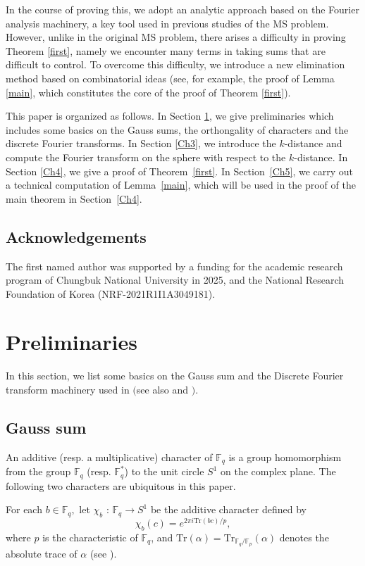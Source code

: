 \documentclass[a4paper,11pt]{amsart}
\numberwithin{equation}{section}
\def\Fq#1{\mathbb{F}_q^{#1}}
\begin{document}
In the course of proving this, we adopt an analytic approach based on the Fourier analysis machinery, a key tool used in previous studies of the MS problem. However, unlike in the original MS problem, there arises a difficulty in proving  Theorem \ref{first}, namely we encounter  many terms in taking sums that are difficult to control. To overcome this difficulty, we introduce a new elimination method based on combinatorial ideas (see, for example, the proof of Lemma \ref{main}, which constitutes the core of the proof of Theorem \ref{first}).

This paper  is organized as follows. In Section \ref{Ch2}, we give preliminaries which includes some basics on the Gauss sums, 
the orthongality of characters and the discrete Fourier transforms. In Section \ref{Ch3}, we introduce the $k$-distance and compute the Fourier transform on the sphere with respect to the $k$-distance. In Section \ref{Ch4}, we give a proof of Theorem~\ref{first}.
In Section~\ref{Ch5}, we carry out a technical computation of Lemma~\ref{main},  which will be used in the proof of the main theorem in Section~\ref{Ch4}.

\subsection*{Acknowledgements}
The first named author was supported by a funding for the academic research program of Chungbuk National University in 2025, and the National Research Foundation of Korea (NRF-2021R1I1A3049181). 




\section{Preliminaries}\label{Ch2}
In this section, we list some basics on the Gauss sum and the Discrete Fourier transform machinery used in \cite{IR07} $($see also \cite{KS13} and \cite{CKPS}$)$. 

\subsection{Gauss sum}
An additive (resp. a multiplicative) character of $\Fq{}$ is a group homomorphism from  the group $\Fq{}$ (resp.  $\Fq{*}$) to the unit circle $S^1$ on the complex plane. The following two characters are ubiquitous in this paper.


For each $b\in \Fq{},$ let  
$\chi_b$ : $\mathbb{F}_q\rightarrow S^1$ be the additive character defined by 
\[
	\chi_b(c) = e^{2\pi i \mathrm{Tr}(bc) / p},
\]
where $p$ is the characteristic of $\Fq{}$, and $\mathrm{Tr}(\alpha)=\mathrm{Tr}_{\Fq{}/\mathbb{F}_p}(\alpha)$ denotes the absolute trace of $\alpha$ (see \cite[Definition 2.22]{LN97}).
\end{document}
